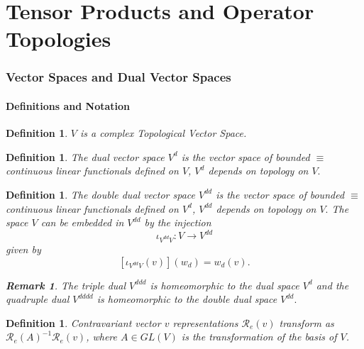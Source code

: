 \documentclass[aps,preprint]{revtex4}
\newtheorem{definition}[theorem]{Definition}
\newtheorem{remark}[theorem]{Remark}
\begin{document}
\title{}
\author{}

\part{Tensor Products and Operator Topologies}

\section{Vector Spaces and Dual Vector Spaces}

\subsection{Definitions and Notation}

\begin{definition}
$V$ is a complex Topological Vector Space.
\end{definition}

\begin{definition}
The dual vector space $V^{d}$ is the vector space of bounded $\equiv $
continuous linear functionals defined on $V$, $V^{d}$ depends on topology on 
$V.$
\end{definition}

\begin{definition}
The double dual vector space $V^{dd}$ is the vector space of bounded $\equiv 
$ continuous linear functionals defined on $V^{d}$, $V^{dd}$ depends on
topology on $V.$ The space $V$ can be embedded in $V^{dd}$ by the injection 
\begin{equation}
\iota _{V^{dd}V}:V\rightarrow V^{dd}
\end{equation}%
given by 
\begin{equation}
\left[ \iota _{V^{dd}V}\left( v\right) \right] \left( w_{d}\right)
=w_{d}\left( v\right) .
\end{equation}

\begin{remark}
The triple dual $V^{ddd}$ is homeomorphic to the dual space $V^{d}$ and the
quadruple dual $V^{dddd}$ is homeomorphic to the double dual space $V^{dd}.$
\end{remark}
\end{definition}

\begin{definition}
\emph{Contravariant} vector $v$ representations $\mathcal{R}_{e}\left(
v\right) $ transform as $\mathcal{R}_{e}\left( A\right) ^{-1}\mathcal{R}%
_{e}\left( v\right) $, where $A\in GL\left( V\right) $ is the transformation
of the basis of $V$.
\end{definition}
\end{document}
